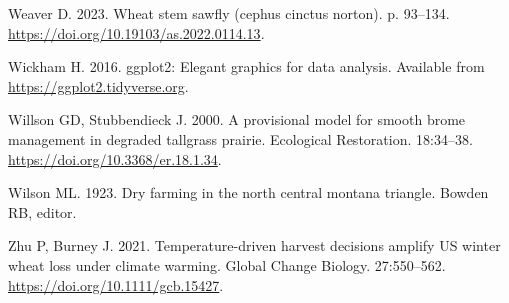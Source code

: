 \documentclass[
]{article}
\newlength{\cslhangindent}
\newenvironment{CSLReferences}[2] %
 {\begin{list}{}{%
  \setlength{\itemindent}{0pt}
  \setlength{\leftmargin}{0pt}
  \setlength{\parsep}{0pt}
  \ifodd #1
   \setlength{\leftmargin}{\cslhangindent}
   \setlength{\itemindent}{-1\cslhangindent}
  \fi
  \setlength{\itemsep}{#2\baselineskip}}}
 {\end{list}}
\begin{document}
\begin{CSLReferences}{0}{1}
Weaver D. 2023. Wheat stem sawfly (cephus cinctus norton). p. 93--134.
\url{https://doi.org/10.19103/as.2022.0114.13}.

Wickham H. 2016. ggplot2: Elegant graphics for data analysis. Available
from \url{https://ggplot2.tidyverse.org}.

Willson GD, Stubbendieck J. 2000. A provisional model for smooth brome
management in degraded tallgrass prairie. Ecological Restoration.
18:34--38. \url{https://doi.org/10.3368/er.18.1.34}.

Wilson ML. 1923. Dry farming in the north central montana triangle.
Bowden RB, editor.

Zhu P, Burney J. 2021. Temperature-driven harvest decisions amplify US
winter wheat loss under climate warming. Global Change Biology.
27:550--562. \url{https://doi.org/10.1111/gcb.15427}.

\end{CSLReferences}
\end{document}
